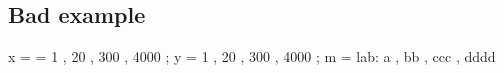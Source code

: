 \documentclass{tutodoc}
\begin{document}


%
%
%
%
%
%
%
%


%


%


\subsection{Bad example \thesubsection}

\begin{functable}
    x = = 1 , 20 , 300 , 4000 ;
    y = 1 , 20 , 300 , 4000 ;
    m = lab: a , bb , ccc , dddd
\end{functable}
\end{document}
